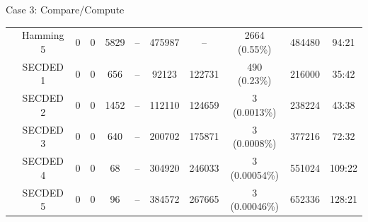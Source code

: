 \begin{frame}[noframenumbering]{Case 3: Compare/Compute}
\begin{table}[H]
\begin{tabular}{@{}ccccccccccc@{}}
                                                               & Hamming 5     & 0     & 0           & 5829  & --          & \num{475987}                             & --                                      & 2664 {\tiny (0.55\%)} & \num{484480} & 94:21                                   \\
                                                               & SECDED 1      & 0     & 0           & 656   & --          & \num{92123 }                             & \num{122731}                            & 490 {\tiny (0.23\%)}  & \num{216000} & 35:42                                   \\
                                                               & SECDED 2      & 0     & 0           & 1452  & --          & \num{112110}                             & \num{124659}                            & 3 {\tiny (0.0013\%)}       & \num{238224} & 43:38                                   \\
                                                               & SECDED 3      & 0     & 0           & 640   & --          & \num{200702}                             & \num{175871}                            & 3 {\tiny (0.0008\%)}       & \num{377216} & 72:32                                   \\
                                                               & SECDED 4      & 0     & 0           & 68    & --          & \num{304920}                             & \num{246033}                            & 3 {\tiny (0.00054\%)}       & \num{551024} & 109:22                                  \\
                                                               & SECDED 5      & 0     & 0           & 96    & --          & \num{384572}                             & \num{267665}                            & 3 {\tiny (0.00046\%)}       & \num{652336} & 128:21                                  \\
            \bottomrule
        \end{tabular}
    \end{table}
\end{frame}
